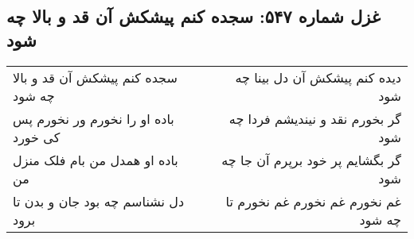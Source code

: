 \begin{center}
\section*{غزل شماره ۵۴۷: سجده کنم پیشکش آن قد و بالا چه شود}
\label{sec:0547}
\begin{longtable}{l p{0.5cm} r}
سجده کنم پیشکش آن قد و بالا چه شود
&&
دیده کنم پیشکش آن دل بینا چه شود
\\
باده او را نخورم ور نخورم پس کی خورد
&&
گر بخورم نقد و نیندیشم فردا چه شود
\\
باده او همدل من بام فلک منزل من
&&
گر بگشایم پر خود برپرم آن جا چه شود
\\
دل نشناسم چه بود جان و بدن تا برود
&&
غم نخورم غم نخورم غم نخورم تا چه شود
\\
\end{longtable}
\end{center}
